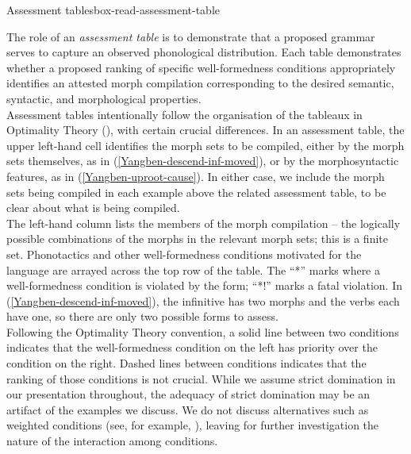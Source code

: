 \begin{dadpbox}{Assessment tables}{box-read-assessment-table}

The role of an \textit{assessment table} is to demonstrate that a proposed grammar serves to capture an observed phonological distribution. Each table demonstrates whether a proposed ranking of specific well-formedness conditions appropriately identifies an attested morph compilation corresponding to the desired semantic, syntactic, and morphological properties. \\

Assessment tables intentionally follow the organisation of the tableaux in Optimality Theory (\citealt{Prince+:1993}), with certain crucial differences. In an assessment table, the upper left-hand cell identifies the morph sets to be compiled, either by the morph sets themselves, as in (\ref{Yangben-descend-inf-moved}), or by the morphosyntactic features, as in (\ref{Yangben-uproot-cause}). In either case, we include the morph sets being compiled in each example above the related assessment table, to be clear about what is being compiled.\\

The left-hand column lists the members of the morph compilation -- the logically possible combinations of the morphs in the relevant morph sets; this is a finite set. Phonotactics and other well-formedness conditions motivated for the language are arrayed across the top row of the table.  The ``*'' marks where a well-formedness condition is violated by the form; ``*!'' marks a fatal violation. In (\ref{Yangben-descend-inf-moved}), the infinitive has two morphs and the verbs each have one, so there are only two possible forms to assess. \\
 
Following the Optimality Theory convention, a solid line between two conditions indicates that the well-formedness condition on the left has priority over the condition on the right. Dashed lines between conditions indicates that the ranking of those conditions is not crucial. While we assume strict domination in our presentation throughout, the adequacy of strict domination may be an artifact of the examples we discuss. We do not discuss alternatives such as weighted conditions (see, for example, \cite{Pater:2009weights, vandeWeijer:2012}), leaving for further investigation the nature of the interaction among conditions.
\end{dadpbox}


